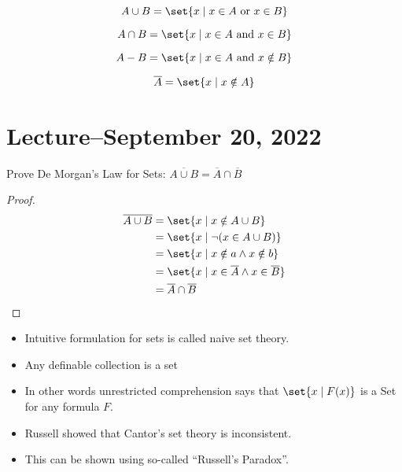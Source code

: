 \documentclass[8pt]{scrreprt}
\begin{document}
\begin{definition}
	\[
		A \cup B = \set{x\mid x\in A \text{ or } x\in B}
	\]
\end{definition}

\begin{definition}[Intersection]
	\[
		A \cap B = \set{x\mid x\in A \text{ and } x\in B}
	\]
\end{definition}

\begin{definition}[Difference]
	\[
		A - B = \set{x\mid x\in A \text{ and } x\notin B}
	\]
\end{definition}

\begin{definition}[Complement]
	\[
		\overline{A} = \set{x\mid x\notin A}
	\]
\end{definition}

\section{Lecture--September 20, 2022}

Prove De Morgan's Law for Sets: $\overline{A\cup B} = \overline{A}\cap \overline{B}$

\begin{proof}
	\begin{align}
		\overline{A\cup B} &= \set{x\mid x\notin A\cup B} \\
						   &= \set{x \mid \neg(x\in A\cup B)} \\
						   &= \set{x \mid x \notin a \land x\notin b} \\
						   &= \set{x \mid x \in \overline{A} \land x\in \overline{B}} \\
		                   &= \overline{A}\cap \overline{B}
	\end{align}
\end{proof}

\begin{itemize}
	\item Intuitive formulation for sets is called naive set theory.
	\item Any definable collection is a set
	\item In other words unrestricted comprehension says that $\set{x\mid F(x)}$ is a Set
	for any formula $F$.
	\item Russell showed that Cantor's set theory is inconsistent.
	\item This can be shown using so-called ``Russell's Paradox''.
\end{itemize}
\end{document}
